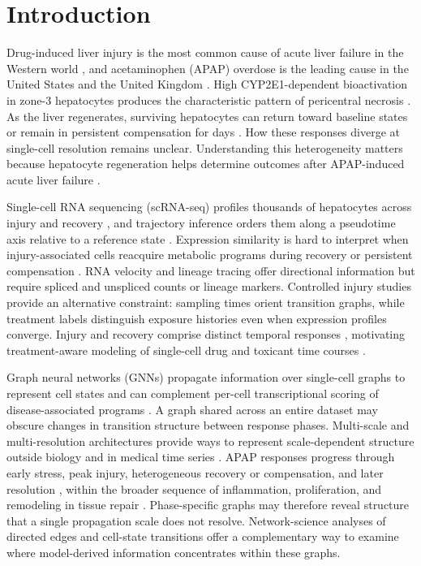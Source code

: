 \section*{Introduction}

Drug-induced liver injury is the most common cause of acute liver failure in the Western world \cite{ref001,ref002}, and acetaminophen (APAP) overdose is the leading cause in the United States and the United Kingdom \cite{ref003,ref004}. High CYP2E1-dependent bioactivation in zone-3 hepatocytes produces the characteristic pattern of pericentral necrosis \cite{ref004,ref005}. As the liver regenerates, surviving hepatocytes can return toward baseline states or remain in persistent compensation for days \cite{ref006,ref007}. How these responses diverge at single-cell resolution remains unclear. Understanding this heterogeneity matters because hepatocyte regeneration helps determine outcomes after APAP-induced acute liver failure \cite{ref006,ref008}.

Single-cell RNA sequencing (scRNA-seq) profiles thousands of hepatocytes across injury and recovery \cite{ref009,ref010,ref011}, and trajectory inference orders them along a pseudotime axis relative to a reference state \cite{ref012,ref013}. Expression similarity is hard to interpret when injury-associated cells reacquire metabolic programs during recovery or persistent compensation \cite{ref010}. RNA velocity \cite{ref014,ref015} and lineage tracing \cite{ref016,ref017} offer directional information but require spliced and unspliced counts or lineage markers. Controlled injury studies provide an alternative constraint: sampling times orient transition graphs, while treatment labels distinguish exposure histories even when expression profiles converge. Injury and recovery comprise distinct temporal responses \cite{ref006,ref018,ref019}, motivating treatment-aware modeling of single-cell drug and toxicant time courses \cite{ref020,ref021,ref022}.

Graph neural networks (GNNs) propagate information over single-cell graphs to represent cell states \cite{ref023,ref024} and can complement per-cell transcriptional scoring of disease-associated programs \cite{ref025,ref026,ref027}. A graph shared across an entire dataset may obscure changes in transition structure between response phases. Multi-scale and multi-resolution architectures provide ways to represent scale-dependent structure outside biology \cite{ref028,ref029,ref030,ref031} and in medical time series \cite{ref032}. APAP responses progress through early stress, peak injury, heterogeneous recovery or compensation, and later resolution \cite{ref006,ref033,ref034}, within the broader sequence of inflammation, proliferation, and remodeling in tissue repair \cite{ref035,ref036,ref037}. Phase-specific graphs may therefore reveal structure that a single propagation scale does not resolve. Network-science analyses of directed edges \cite{ref038,ref039} and cell-state transitions \cite{ref040,ref041} offer a complementary way to examine where model-derived information concentrates within these graphs.

